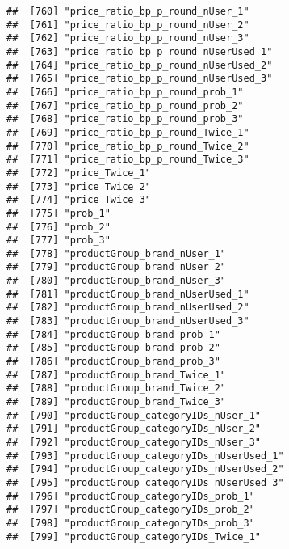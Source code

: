 \documentclass[10pt]{report}
\begin{document}
\begin{verbatim}
##  [760] "price_ratio_bp_p_round_nUser_1"                       
##  [761] "price_ratio_bp_p_round_nUser_2"                       
##  [762] "price_ratio_bp_p_round_nUser_3"                       
##  [763] "price_ratio_bp_p_round_nUserUsed_1"                   
##  [764] "price_ratio_bp_p_round_nUserUsed_2"                   
##  [765] "price_ratio_bp_p_round_nUserUsed_3"                   
##  [766] "price_ratio_bp_p_round_prob_1"                        
##  [767] "price_ratio_bp_p_round_prob_2"                        
##  [768] "price_ratio_bp_p_round_prob_3"                        
##  [769] "price_ratio_bp_p_round_Twice_1"                       
##  [770] "price_ratio_bp_p_round_Twice_2"                       
##  [771] "price_ratio_bp_p_round_Twice_3"                       
##  [772] "price_Twice_1"                                        
##  [773] "price_Twice_2"                                        
##  [774] "price_Twice_3"                                        
##  [775] "prob_1"                                               
##  [776] "prob_2"                                               
##  [777] "prob_3"                                               
##  [778] "productGroup_brand_nUser_1"                           
##  [779] "productGroup_brand_nUser_2"                           
##  [780] "productGroup_brand_nUser_3"                           
##  [781] "productGroup_brand_nUserUsed_1"                       
##  [782] "productGroup_brand_nUserUsed_2"                       
##  [783] "productGroup_brand_nUserUsed_3"                       
##  [784] "productGroup_brand_prob_1"                            
##  [785] "productGroup_brand_prob_2"                            
##  [786] "productGroup_brand_prob_3"                            
##  [787] "productGroup_brand_Twice_1"                           
##  [788] "productGroup_brand_Twice_2"                           
##  [789] "productGroup_brand_Twice_3"                           
##  [790] "productGroup_categoryIDs_nUser_1"                     
##  [791] "productGroup_categoryIDs_nUser_2"                     
##  [792] "productGroup_categoryIDs_nUser_3"                     
##  [793] "productGroup_categoryIDs_nUserUsed_1"                 
##  [794] "productGroup_categoryIDs_nUserUsed_2"                 
##  [795] "productGroup_categoryIDs_nUserUsed_3"                 
##  [796] "productGroup_categoryIDs_prob_1"                      
##  [797] "productGroup_categoryIDs_prob_2"                      
##  [798] "productGroup_categoryIDs_prob_3"                      
##  [799] "productGroup_categoryIDs_Twice_1"                     

\end{verbatim}
\end{document}
